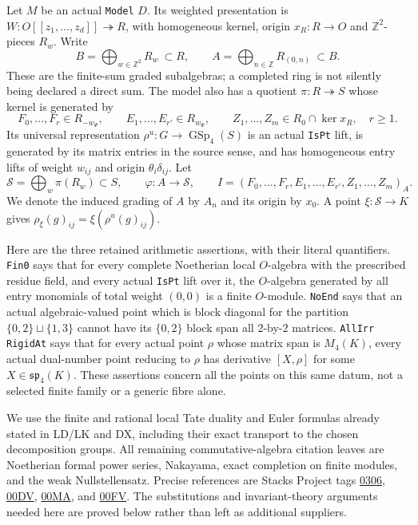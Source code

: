 Let $M$ be an actual \texttt{Model} $D$.  Its weighted
presentation is $W:O[[z_1,\ldots,z_d]]\twoheadrightarrow R$,
with homogeneous kernel, origin $x_R:R\to O$ and
$\mathbb Z^2$-pieces $R_w$.  Write
\[
 B=\bigoplus_{w\in\mathbb Z^2}R_w\ \subset R,\qquad
 A=\bigoplus_{n\in\mathbb Z}R_{(0,n)}\ \subset B.
 \tag{PX.3}
\]
These are the finite-sum graded subalgebras; a completed ring
is not silently being declared a direct sum.  The model also
has a quotient $\pi:R\twoheadrightarrow S$ whose kernel is
generated by
\[
 F_0,\ldots,F_r\in R_{-w_\Psi},\qquad
 E_1,\ldots,E_{r'}\in R_{w_\Psi},\qquad
 Z_1,\ldots,Z_m\in R_0\cap\ker x_R,
 \quad r\ge1.
 \tag{PX.4}
\]
Its universal representation $\rho^u:G\to\operatorname{GSp}_4(S)$
is an actual \texttt{IsPt} lift, is generated by its matrix
entries in the source sense, and has homogeneous entry lifts
of weight $w_{ij}$ and origin $\theta_i\delta_{ij}$.
Let
\[
 \mathcal S=\bigoplus_w\pi(R_w)\subset S,
 \qquad \varphi:A\longrightarrow\mathcal S,
 \qquad I=(F_0,\ldots,F_r,E_1,\ldots,E_{r'},Z_1,\ldots,Z_m)_A.
 \tag{PX.5}
\]
We denote the induced grading of $A$ by $A_n$ and its origin
by $x_0$.  A point $\xi:\mathcal S\to K$ gives
$\rho_\xi(g)_{ij}=\xi(\rho^u(g)_{ij})$.

Here are the three retained arithmetic assertions, with their
literal quantifiers.  \texttt{Fin0} says that for every complete
Noetherian local $O$-algebra with the prescribed residue field,
and every actual \texttt{IsPt} lift over it, the $O$-algebra
generated by all entry monomials of total weight $(0,0)$ is a
finite $O$-module.  \texttt{NoEnd} says that an actual
algebraic-valued point which is block diagonal for the partition
$\{0,2\}\sqcup\{1,3\}$ cannot have its $\{0,2\}$ block
span all $2$-by-$2$ matrices.  \texttt{AllIrr RigidAt} says that
for every actual point $\rho$ whose matrix span is $M_4(K)$,
every actual dual-number point reducing to $\rho$ has derivative
$[X,\rho]$ for some $X\in\mathfrak{sp}_4(K)$.
These assertions concern all the points on this same datum,
not a selected finite family or a generic fibre alone.

We use the finite and rational local Tate duality and Euler
formulas already stated in LD/LK and DX, including their exact
transport to the chosen decomposition groups.  All remaining
commutative-algebra citation leaves are Noetherian formal
power series, Nakayama, exact completion on finite modules,
and the weak Nullstellensatz.  Precise references are Stacks
Project tags \href{https://stacks.math.columbia.edu/tag/0306}{0306},
\href{https://stacks.math.columbia.edu/tag/00DV}{00DV},
\href{https://stacks.math.columbia.edu/tag/00MA}{00MA}, and
\href{https://stacks.math.columbia.edu/tag/00FV}{00FV}.
The substitutions and invariant-theory arguments needed here
are proved below rather than left as additional suppliers.

